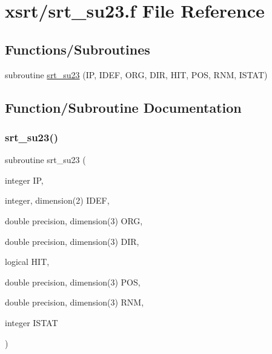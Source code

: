 \hypertarget{srt__su23_8f}{}\section{xsrt/srt\+\_\+su23.f File Reference}
\label{srt__su23_8f}
\subsection*{Functions/\+Subroutines}
\begin{DoxyCompactItemize}
\item 
subroutine \hyperlink{srt__su23_8f_ac92d0e8acd818c9227dc871383f10512}{srt\+\_\+su23} (IP, I\+D\+EF, O\+RG, D\+IR, H\+IT, P\+OS, R\+NM, I\+S\+T\+AT)
\end{DoxyCompactItemize}


\subsection{Function/\+Subroutine Documentation}
\mbox{\label{srt__su23_8f_ac92d0e8acd818c9227dc871383f10512}} 
\subsubsection{\texorpdfstring{srt\+\_\+su23()}{srt\_su23()}}
{\footnotesize\ttfamily subroutine srt\+\_\+su23 (\begin{DoxyParamCaption}\item[{integer}]{IP,  }\item[{integer, dimension(2)}]{I\+D\+EF,  }\item[{double precision, dimension(3)}]{O\+RG,  }\item[{double precision, dimension(3)}]{D\+IR,  }\item[{logical}]{H\+IT,  }\item[{double precision, dimension(3)}]{P\+OS,  }\item[{double precision, dimension(3)}]{R\+NM,  }\item[{integer}]{I\+S\+T\+AT }\end{DoxyParamCaption})}

